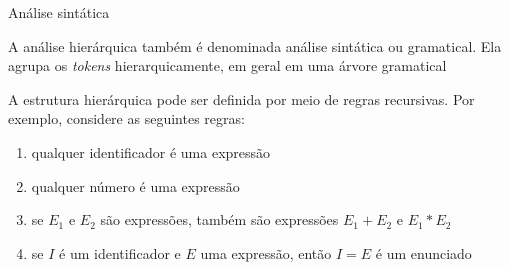 \begin{frame}[fragile]{Análise sintática}

    A análise hierárquica também é denominada análise sintática ou gramatical. Ela agrupa os \textit{tokens} hierarquicamente, em geral em uma
    árvore gramatical%

    \vspace{0.1in}
    A estrutura hierárquica pode ser definida por meio de regras recursivas.
    Por exemplo, considere as seguintes regras:
    \vspace{0.1in}

    \begin{enumerate}
        \item qualquer identificador é uma expressão

        \item qualquer número é uma expressão

        \item se $E_1$ e $E_2$ são expressões, também são expressões $E_1 + E_2$ e $E_1 * E_2$
    
        \item se $I$ é um identificador e $E$ uma expressão, então $I = E$ é um enunciado
    \end{enumerate}

\end{frame}

